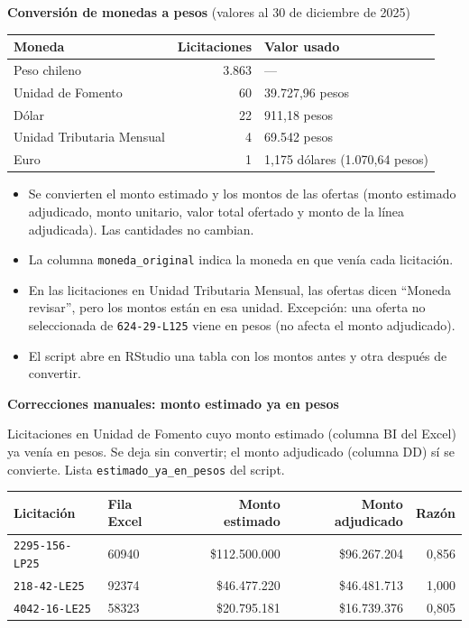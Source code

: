 \documentclass[11pt,a4paper]{article}
\newcommand{\cod}[1]{\texttt{#1}}
\begin{document}
\textbf{Conversión de monedas a pesos} (valores al 30 de diciembre de 2025)

\begin{center}
\begin{tabular}{lrl}
\toprule
Moneda & Licitaciones & Valor usado \\
\midrule
Peso chileno & 3.863 & --- \\
Unidad de Fomento & 60 & 39.727,96 pesos \\
Dólar & 22 & 911,18 pesos \\
Unidad Tributaria Mensual & 4 & 69.542 pesos \\
Euro & 1 & 1,175 dólares (1.070,64 pesos) \\
\bottomrule
\end{tabular}
\end{center}

\begin{itemize}
  \item Se convierten el monto estimado y los montos de las ofertas (monto estimado adjudicado, monto unitario, valor total ofertado y monto de la línea adjudicada). Las cantidades no cambian.
  \item La columna \cod{moneda\_original} indica la moneda en que venía cada licitación.
  \item En las licitaciones en Unidad Tributaria Mensual, las ofertas dicen ``Moneda revisar'', pero los montos están en esa unidad. Excepción: una oferta no seleccionada de \cod{624-29-L125} viene en pesos (no afecta el monto adjudicado).
  \item El script abre en RStudio una tabla con los montos antes y otra después de convertir.
\end{itemize}

\textbf{Correcciones manuales: monto estimado ya en pesos}

Licitaciones en Unidad de Fomento cuyo monto estimado (columna BI del Excel) ya venía en pesos. Se deja sin convertir; el monto adjudicado (columna DD) sí se convierte. Lista \cod{estimado\_ya\_en\_pesos} del script.

\begin{center}
\begin{tabular}{llrrr}
\toprule
Licitación & Fila Excel & Monto estimado & Monto adjudicado & Razón \\
\midrule
\cod{2295-156-LP25} & 60940 & \$112.500.000 & \$96.267.204 & 0,856 \\
\cod{218-42-LE25}   & 92374 & \$46.477.220  & \$46.481.713 & 1,000 \\
\cod{4042-16-LE25}  & 58323 & \$20.795.181  & \$16.739.376 & 0,805 \\
\bottomrule
\end{tabular}
\end{center}
\end{document}
